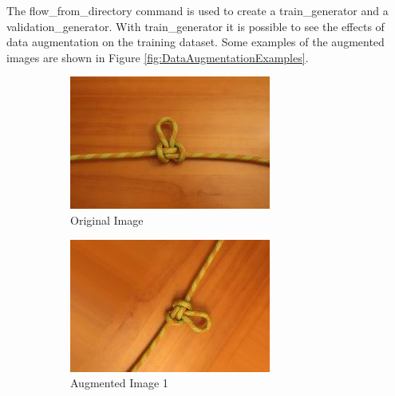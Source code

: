 \documentclass{l4proj}
\begin{document}
The flow\_from\_directory command is used to create a train\_generator and a validation\_generator.
With train\_generator it is possible to see the effects of data augmentation on the training dataset.
Some examples of the augmented images are shown in Figure \ref{fig:DataAugmentationExamples}.

\begin{figure}[h]
	\begin{subfigure}{.33\textwidth}
		\centering
        \includegraphics[width=\linewidth]{AugOriginal}
        \caption{Original Image}
        \label{fig:AugOriginal}
	\end{subfigure}
	\begin{subfigure}{.33\textwidth}
		\centering
        \includegraphics[width=\linewidth]{augmented1}
        \caption{Augmented Image 1}
        \label{fig:Aug1}
	\end{subfigure}
	\begin{subfigure}{.33\textwidth}

\end{subfigure}
\end{figure}
\end{document}
